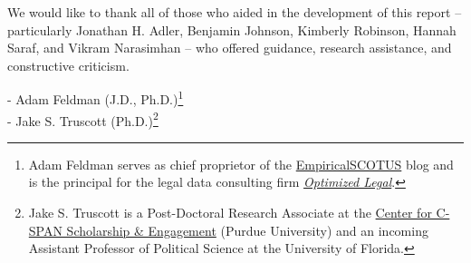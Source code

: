 \noindent We would like to thank all of those who aided in the development of this report -- particularly Jonathan H. Adler, Benjamin Johnson, Kimberly Robinson, Hannah Saraf, and Vikram Narasimhan --  who offered guidance, research assistance, and constructive criticism. \\

\begin{flushright}
- Adam Feldman (J.D., Ph.D.)\footnote{Adam Feldman serves as chief proprietor of the \href{https://empiricalscotus.com/}{EmpiricalSCOTUS} blog and is the principal for the legal data consulting firm \href{https://empiricalscotus.com/optimizedlegal/}{\emph{Optimized Legal}}.}\\
- Jake S. Truscott (Ph.D.)\footnote{Jake S. Truscott is a Post-Doctoral Research Associate at the \href{https://cla.purdue.edu/communication/ccse/}{Center for C-SPAN Scholarship \& Engagement} (Purdue University) and an incoming Assistant Professor of Political Science at the University of Florida.}
\end{flushright}
